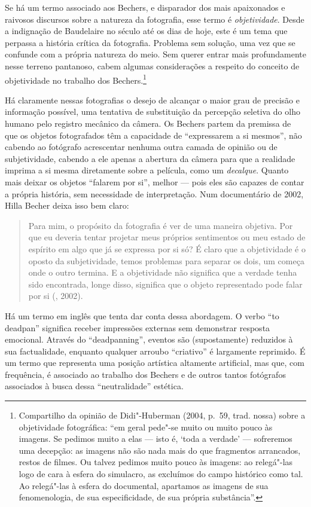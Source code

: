 Se há um termo associado aos Bechers, e disparador dos mais apaixonados
e raivosos discursos sobre a natureza da fotografia, esse termo é
\emph{objetividade}. Desde a indignação de Baudelaire no século  até
os dias de hoje, este é um tema que perpassa a história crítica da
fotografia. Problema sem solução, uma vez que se confunde com a própria
natureza do meio. Sem querer entrar mais profundamente nesse terreno
pantanoso, cabem algumas considerações a respeito do conceito de
objetividade no trabalho dos Bechers.\footnote{Compartilho da opinião de
  Didi"-Huberman (2004, p.~59, trad. nossa) sobre a objetividade fotográfica: ``em geral pede"-se
  muito ou muito pouco às imagens. Se pedimos muito a elas --- isto é,
  `toda a verdade' --- sofreremos uma decepção: as imagens não são nada
  mais do que fragmentos arrancados, restos de filmes. Ou talvez pedimos
  muito pouco às imagens: ao relegá"-las logo de cara à esfera do
  simulacro, as excluímos do campo histórico como tal. Ao relegá"-las à
  esfera do documental, apartamos as imagens de sua fenomenologia, de
  sua especificidade, de sua própria substância''.}

Há claramente nessas fotografias o desejo de alcançar o maior grau de
precisão e informação possível, uma tentativa de substituição da
percepção seletiva do olho humano pelo registro mecânico da câmera. Os
Bechers partem da premissa de que os objetos fotografados têm a
capacidade de ``expressarem a si mesmos'', não cabendo ao fotógrafo
acrescentar nenhuma outra camada de opinião ou de subjetividade, cabendo
a ele apenas a abertura da câmera para que a realidade imprima a si
mesma diretamente sobre a película, como um \emph{decalque}. Quanto mais
deixar os objetos ``falarem por si'', melhor --- pois eles são capazes de
contar a própria história, sem necessidade de interpretação. Num
documentário de 2002, Hilla Becher deixa isso bem claro:

\begin{quote}
Para mim, o propósito da fotografia é ver de uma maneira objetiva. Por
que eu deveria tentar projetar meus próprios sentimentos ou meu estado
de espírito em algo que já se expressa por si só? É claro que a
objetividade é o oposto da subjetividade, temos problemas para separar
os dois, um começa onde o outro termina. E a objetividade não significa
que a verdade tenha sido encontrada, longe disso, significa que o objeto
representado pode falar por si (, 2002).
\end{quote}

Há um termo em inglês que tenta dar conta dessa abordagem. O verbo ``to
deadpan'' significa receber impressões externas sem demonstrar resposta
emocional. Através do ``deadpanning'', eventos são (supostamente)
reduzidos à sua factualidade, enquanto qualquer arroubo ``criativo'' é
largamente reprimido. É um termo que representa uma posição artística
altamente artificial, mas que, com frequência, é associado ao trabalho
dos Bechers e de outros tantos fotógrafos associados à busca dessa
``neutralidade'' estética.

